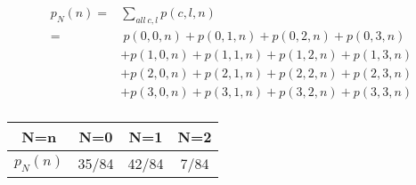 \documentclass{article}
\begin{document}
\begin{equation} \label{eq3}
\begin{split}
p_N(n) = & \sum_{all\ c, l} p(c, l, n) \\
 = &\ p(0, 0, n) + p(0, 1, n) + p(0, 2, n) + p(0, 3, n) \\
& + p(1, 0, n) + p(1, 1, n) + p(1, 2, n) + p(1, 3, n) \\
& + p(2, 0, n) + p(2, 1, n) + p(2, 2, n) + p(2, 3, n) \\
& + p(3, 0, n) + p(3, 1, n) + p(3, 2, n) + p(3, 3, n) \\
\end{split}
\end{equation}
\begin{center}
 \begin{tabular}{|| c c c c ||} 
 \hline
N=n & N=0 & N=1 & N=2\\ [0.5ex] 
 \hline\hline
$p_N(n)$ & 35/84 & 42/84 & 7/84\\ 
 \hline
\end{tabular}
\end{center}
\end{document}
